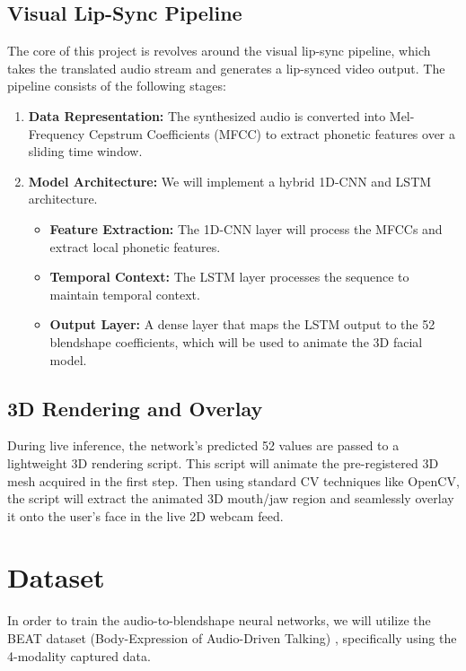 \subsection{Visual Lip-Sync Pipeline}
The core of this project is revolves around the visual lip-sync pipeline, which takes the translated audio stream and generates a lip-synced video output. The pipeline consists of the following stages:
\begin{enumerate} 
    \item \textbf{Data Representation:} The synthesized audio is converted into Mel-Frequency Cepstrum Coefficients (MFCC) to extract phonetic features over a sliding time window.
    \item \textbf{Model Architecture:} We will implement a hybrid 1D-CNN and LSTM architecture.
    \begin{itemize}
        \item \textbf{Feature Extraction:} The 1D-CNN layer will process the MFCCs and extract local phonetic features.
        \item \textbf{Temporal Context:} The LSTM layer processes the sequence to maintain temporal context.
        \item \textbf{Output Layer:} A dense layer that maps the LSTM output to the 52 blendshape coefficients, which will be used to animate the 3D facial model.
    \end{itemize}
\end{enumerate}

\subsection{3D Rendering and Overlay}
During live inference, the network's predicted 52 values are passed to a lightweight 3D rendering script. This script will animate the pre-registered 3D mesh acquired in the first step. Then using standard CV techniques like OpenCV, the script will extract the animated 3D mouth/jaw region and seamlessly overlay it onto the user's face in the live 2D webcam feed.

\section{Dataset}

In order to train the audio-to-blendshape neural networks, we will utilize the BEAT dataset (Body-Expression of Audio-Driven Talking) \cite{liu2022beat}, specifically using the 4-modality captured data.

